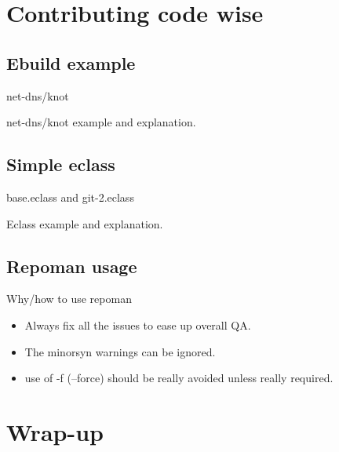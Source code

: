 \documentclass{beamer}
\begin{document}


\section{Contributing code wise}

\subsection{Ebuild example}

\begin{frame}{net-dns/knot}
	\begin{center}net-dns/knot example and explanation.\end{center}
\end{frame}

\subsection{Simple eclass}

\begin{frame}{base.eclass and git-2.eclass}
        \begin{center}Eclass example and explanation.\end{center}
\end{frame}

\subsection{Repoman usage}

\begin{frame}{Why/how to use repoman}
	\begin{itemize}
		\item Always fix all the issues to ease up overall QA. 
		\item The minorsyn warnings can be ignored.
		\item use of -f (--force) should be really avoided unless really required.
	\end{itemize}
\end{frame}


\section{Wrap-up}
\end{document}
